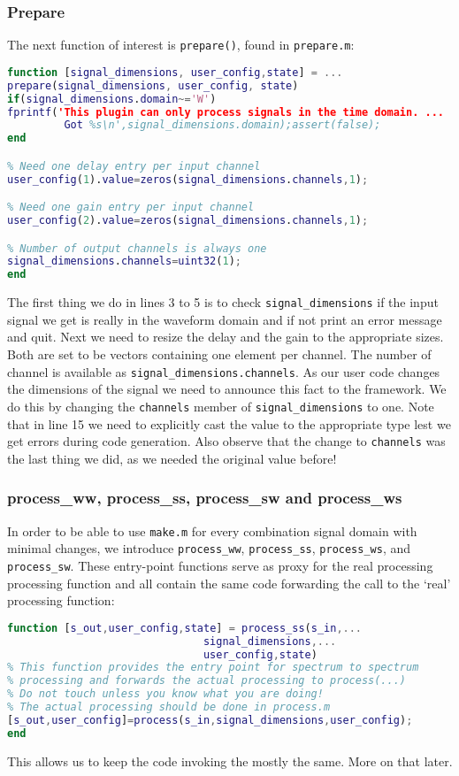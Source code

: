 \documentclass[11pt,a4paper,twoside]{article}
\newcommand{\+}{\discretionary{\mbox{\scriptsize$\hookleftarrow$}}{}{}}
\begin{document}
\subsubsection*{Prepare}
The next function of interest is \texttt{prepare()}, found in \texttt{prepare.m}:
\begin{lstlisting}[language=Matlab]
function [signal_dimensions, user_config,state] = ...
prepare(signal_dimensions, user_config, state)
if(signal_dimensions.domain~='W')
fprintf('This plugin can only process signals in the time domain. ...
         Got %s\n',signal_dimensions.domain);assert(false);
end

% Need one delay entry per input channel
user_config(1).value=zeros(signal_dimensions.channels,1);

% Need one gain entry per input channel
user_config(2).value=zeros(signal_dimensions.channels,1);

% Number of output channels is always one
signal_dimensions.channels=uint32(1);
end
\end{lstlisting}
The first thing we do in lines 3 to 5 is to check \texttt{signal\_dimensions} if the
input signal we get is really in the waveform domain and if not print an error
message and quit.
Next we need to resize the delay and the gain to the appropriate sizes. Both are
set to be vectors containing one element per channel. The number of channel is
available as \texttt{signal\_dimensions.channels}. As our user code changes the
dimensions of the signal we need to announce this fact to the \mha{} framework.
We do this by changing the \texttt{channels} member of \texttt{signal\_dimensions} to one.
Note that in line 15 we need to explicitly cast the value to the appropriate type lest we
get errors during code generation. Also observe that the change to \texttt{channels}
was the last thing we did, as we needed the original value before!
\subsubsection*{process\_ww, process\_ss, process\_sw and process\_ws}
In order to be able to use \texttt{make.m} for every combination signal domain
with minimal changes, we introduce \texttt{process\_ww}, \texttt{process\_ss},
\texttt{process\_ws}, and \texttt{process\_sw}. These entry-point functions serve
as proxy for the real processing processing function and all contain the same
code forwarding the call to the `real' processing function:
\begin{lstlisting}[language=Matlab]
function [s_out,user_config,state] = process_ss(s_in,...
                               signal_dimensions,...
                               user_config,state)
% This function provides the entry point for spectrum to spectrum
% processing and forwards the actual processing to process(...)
% Do not touch unless you know what you are doing! 
% The actual processing should be done in process.m
[s_out,user_config]=process(s_in,signal_dimensions,user_config);
end
\end{lstlisting}
This allows us to keep the code invoking the \Matlab{} mostly the same. More on
that later. 
\end{document}

